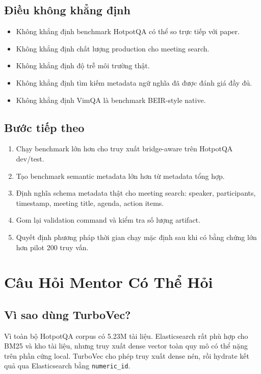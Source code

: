 \documentclass[11pt,a4paper]{article}
\begin{document}
\subsection{Điều không khẳng định}

\begin{itemize}
  \item Không khẳng định benchmark HotpotQA có thể so trực tiếp với paper.
  \item Không khẳng định chất lượng production cho meeting search.
  \item Không khẳng định độ trễ môi trường thật.
  \item Không khẳng định tìm kiếm metadata ngữ nghĩa đã được đánh giá đầy đủ.
  \item Không khẳng định VimQA là benchmark BEIR-style native.
\end{itemize}

\subsection{Bước tiếp theo}

\begin{enumerate}
  \item Chạy benchmark lớn hơn cho truy xuất bridge-aware trên HotpotQA dev/test.
  \item Tạo benchmark semantic metadata lớn hơn từ metadata tổng hợp.
  \item Định nghĩa schema metadata thật cho meeting search: speaker, participants, timestamp, meeting title, agenda, action items.
  \item Gom lại validation command và kiểm tra số lượng artifact.
  \item Quyết định phương pháp thời gian chạy mặc định sau khi có bằng chứng lớn hơn pilot 200 truy vấn.
\end{enumerate}

\section{Câu Hỏi Mentor Có Thể Hỏi}

\subsection*{Vì sao dùng TurboVec?}

Vì toàn bộ HotpotQA corpus có 5.23M tài liệu. Elasticsearch rất phù hợp cho BM25 và kho tài liệu,
nhưng truy xuất dense vector toàn quy mô có thể nặng trên phần cứng local. TurboVec cho phép truy xuất dense
nén, rồi hydrate kết quả qua Elasticsearch bằng \texttt{numeric\_id}.
\end{document}
